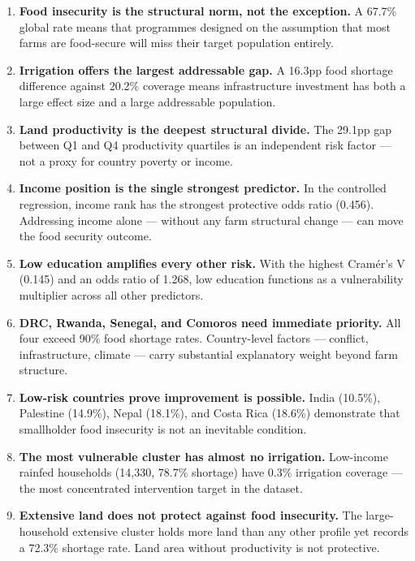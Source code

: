\documentclass[11pt,a4paper]{article}
\begin{document}
\begin{enumerate}

  \item \textbf{Food insecurity is the structural norm, not the exception.} A 67.7\% global rate means that programmes designed on the assumption that most farms are food-secure will miss their target population entirely.

  \item \textbf{Irrigation offers the largest addressable gap.} A 16.3pp food shortage difference against 20.2\% coverage means infrastructure investment has both a large effect size and a large addressable population.

  \item \textbf{Land productivity is the deepest structural divide.} The 29.1pp gap between Q1 and Q4 productivity quartiles is an independent risk factor — not a proxy for country poverty or income.

  \item \textbf{Income position is the single strongest predictor.} In the controlled regression, income rank has the strongest protective odds ratio (0.456). Addressing income alone — without any farm structural change — can move the food security outcome.

  \item \textbf{Low education amplifies every other risk.} With the highest Cramér's V (0.145) and an odds ratio of 1.268, low education functions as a vulnerability multiplier across all other predictors.

  \item \textbf{DRC, Rwanda, Senegal, and Comoros need immediate priority.} All four exceed 90\% food shortage rates. Country-level factors — conflict, infrastructure, climate — carry substantial explanatory weight beyond farm structure.

  \item \textbf{Low-risk countries prove improvement is possible.} India (10.5\%), Palestine (14.9\%), Nepal (18.1\%), and Costa Rica (18.6\%) demonstrate that smallholder food insecurity is not an inevitable condition.

  \item \textbf{The most vulnerable cluster has almost no irrigation.} Low-income rainfed households (14,330, 78.7\% shortage) have 0.3\% irrigation coverage — the most concentrated intervention target in the dataset.

  \item \textbf{Extensive land does not protect against food insecurity.} The large-household extensive cluster holds more land than any other profile yet records a 72.3\% shortage rate. Land area without productivity is not protective.


\end{enumerate}
\end{document}
